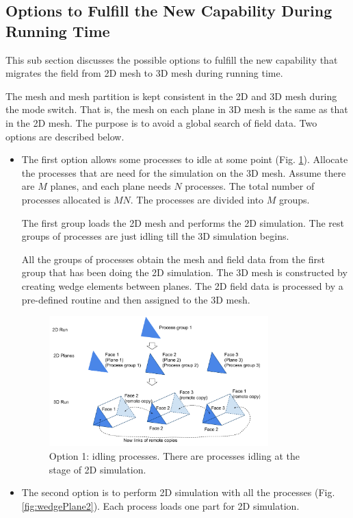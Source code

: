 \documentclass[11pt]{article}  %
\begin{document}
\subsection{Options to Fulfill the New Capability During Running Time}
This sub section discusses the possible options to fulfill the new capability that migrates the field from 2D mesh to 3D mesh during running time.

The mesh and mesh partition is kept consistent in the 2D and 3D mesh during the mode switch. That is, the mesh on each plane in 3D mesh is the same as that in the 2D mesh.  The purpose is to avoid a global search of field data. Two options are described below.
\begin{itemize}
\item[1] The first option allows some processes to idle at some point (Fig. \ref{fig:wedgePlane}).  Allocate the processes that are need for the simulation on the 3D mesh. Assume there are $M$ planes, and each plane needs $N$ processes. The total number of processes allocated is $MN$. The processes are divided into $M$ groups.

The first group loads the 2D mesh and performs the 2D simulation. The rest groups of processes are just idling till the 3D simulation begins.

All the groups of processes obtain the mesh and field data from the first group that has been doing the 2D simulation. The 3D mesh is constructed by creating wedge elements between planes.  The 2D field data is processed by a pre-defined routine and then assigned to the 3D mesh. 
\begin{figure}[htb]
\center
\includegraphics[width=0.8\textwidth]{fig/wedgePlane.png}
\caption{Option 1: idling processes. There are processes idling at the stage of 2D simulation.} \label{fig:wedgePlane}
\end{figure}
\item[2] The second option is to perform 2D simulation with all the processes (Fig. \ref{fig:wedgePlane2}).  Each process loads one part for 2D simulation.


\end{itemize}
\end{document}
